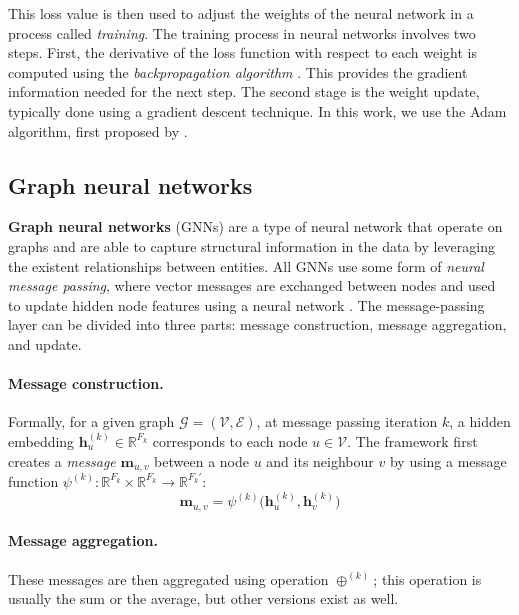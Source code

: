 This loss value is then used to adjust the weights of the neural network in a process called \textit{training}. The training process in neural networks involves two steps. First, the derivative of the loss function with respect to each weight is computed using the \textit{backpropagation algorithm} \citep{backpropagation1}. This provides the gradient information needed for the next step. The second stage is the weight update, typically done using a gradient descent technique. In this work, we use the Adam algorithm, first proposed by \citet{adam}.

\subsection{Graph neural networks}

\textbf{Graph neural networks} (GNNs) are a type of neural network that operate on graphs and are able to capture structural information in the data by leveraging the existent relationships between entities. 
All GNNs use some form of \textit{neural message passing}, where vector messages are exchanged between nodes and used to update hidden node features using a neural network \citep{gilmer2017neural}. The message-passing layer can be divided into three parts: message construction, message aggregation, and update. 

\paragraph{Message construction.} 
Formally, for a given graph $\mathcal{G} = (\mathcal{V}, \mathcal{E})$, at message passing iteration $k$, a hidden embedding $\textbf{h}_u^{(k)} \in \mathbb{R}^{F_k}$ corresponds to each node $u \in \mathcal{V}$. 
The framework first creates a \textit{message} $\mathbf{m}_{u,v}$ between a node $u$ and its neighbour $v$ by using a message function $\psi^{(k)}: \mathbb{R}^{F_k}\times\mathbb{R}^{F_k} \rightarrow \mathbb{R}^{F_{k}'}$:
\begin{equation}
    \mathbf{m}_{u, v} = \psi^{(k)}\Big(\textbf{h}_{u}^{(k)}, \textbf{h}_v^{(k)}\Big)
\end{equation}
\paragraph{Message aggregation.} 
These messages are then aggregated using operation $\oplus^{(k)}$; 
this operation is usually the sum or the average, but other versions exist as well. 

